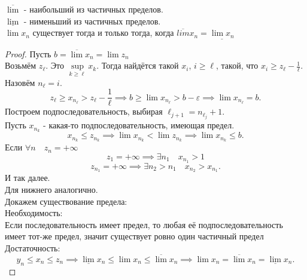 \documentclass[11pt, oneside]{article}   	%
\begin{document}
    \begin{theorem}
        $\overline{\lim}$ - наибольший из частичных пределов.\\
        $\underline{\lim}$ - нименьший из частичных пределов.\\
        $\lim x_n$ существует тогда и только тогда, когда  $\overline{lim} x_n = \underline{\lim x_n}$ \\
        \begin{proof}
            Пусть $b = \overline{\lim} x_n = \lim z_n$ \\
            Возьмём $z_\ell$. Это  $\sup\limits_{k\ge \ell} x_k$. Тогда найдётся такой $x_i$, $i\ge \ell$, такой, что  $x_i \ge z_{\ell} - \frac{1}{\ell}$.\\
            Назовём $n_{\ell} = i$.\\
            \[ z_{\ell} \ge x_{n_\ell} > z_{\ell}-\frac{1}{\ell} \implies b \ge \lim x_{n_\ell} >b-\varepsilon \implies \lim x_{n_\ell} = b.\]
            Построем подпоследовательность, выбирая $\ell_{j+1} = n_{\ell_j} + 1$.\\
            Пусть $x_{n_k}$ - какая-то подпоследовательность, имеющая предел.\\
            \[ x_{n_k} \le z_{n_k} \implies \lim x_{n_k} < \lim z_{n_k} \implies \lim x_{n_k} \le  b .\]
            Если $\forall{n}\quad z_n = +\infty$
            \[z_1 = +\infty \implies \exists{n_1}\quad   x_{n_1} > 1\]
            \[ z_{n_1} =  +\infty \implies \exists{n_2 > n_1}\quad x_{n_2} > x_{n_1} .\]
            И так далее.\\
            Для нижнего аналогично.\\
            Докажем существование предела:\\
            Необходимость:\\
            Если последовательность имеет предел, то любая её подпоследовательность имеет тот-же предел, значит существует ровно один частичный предел\\
            Достаточность:\\
            \[ y_n \le x_n \le z_n \implies \underline{\lim} x_n \le \lim x_n \le \overline{\lim} x_n \implies \lim x_n = \overline{\lim} x_n = \underline{\lim} x_n .\]
        \end{proof}
    \end{theorem}
\end{document}
